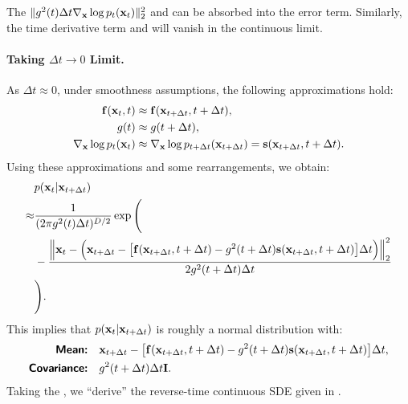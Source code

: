 The  $\|g^2(t) \Delta t \nabla_{{\mathbf{x}}} \log p_t({\mathbf{x}}_t)\|_2^2$   and can be absorbed into the error term. Similarly, the time derivative term  and will vanish in the continuous limit. 

\paragraph{Taking $\Delta t \rightarrow 0$ Limit.}
As $\Delta t \approx 0$, under smoothness assumptions, the following approximations hold:
\begin{align*}
    {\mathbf{f}}({\mathbf{x}}_t, t) &\approx {\mathbf{f}}({\mathbf{x}}_{t+\Delta t}, t+\Delta t), \\
    g(t) &\approx g(t+\Delta t), \\
    \nabla_{{\mathbf{x}}} \log p_t({\mathbf{x}}_t) &\approx \nabla_{{\mathbf{x}}} \log p_{t+\Delta t}({\mathbf{x}}_{t+\Delta t})  = {\mathbf{s}}({\mathbf{x}}_{t+\Delta t}, t+\Delta t).
\end{align*}
Using these approximations and some rearrangements, we obtain:
\begin{align*}
    &p({\mathbf{x}}_t | {\mathbf{x}}_{t+\Delta t}) \\ \approx &\frac{1}{(2\pi g^2(t) \Delta t)^{D/2}}  \exp \Bigg(
            \\ &-\frac{\Big\|{\mathbf{x}}_{t} - \Big({\mathbf{x}}_{t+\Delta t} - \big[{\mathbf{f}}({\mathbf{x}}_{t+\Delta t}, t+\Delta t) - g^2({t+\Delta t}) {\mathbf{s}}({\mathbf{x}}_{t+\Delta t}, t+\Delta t)\big] \Delta t\Big) \Big\|_2^2 }{2 g^2(t+\Delta t) \Delta t} \\
            &\Bigg).
\end{align*}
This implies that $p({\mathbf{x}}_t | {\mathbf{x}}_{t+\Delta t})$ is roughly a normal distribution with:
\begin{align*}
    \text{{\sffamily\textbf{Mean:}}} &  \quad{\mathbf{x}}_{t+\Delta t} - \big[{\mathbf{f}}({\mathbf{x}}_{t+\Delta t}, t+\Delta t) - g^2(t+\Delta t) {\mathbf{s}} ({\mathbf{x}}_{t+\Delta t}, t+\Delta t)\big] \Delta t, \\
    \text{{\sffamily\textbf{Covariance:}}} & \quad g^2(t+\Delta t) \Delta t \mathbf{I}.
\end{align*}
Taking the , we ``derive'' the reverse-time continuous SDE given in .






